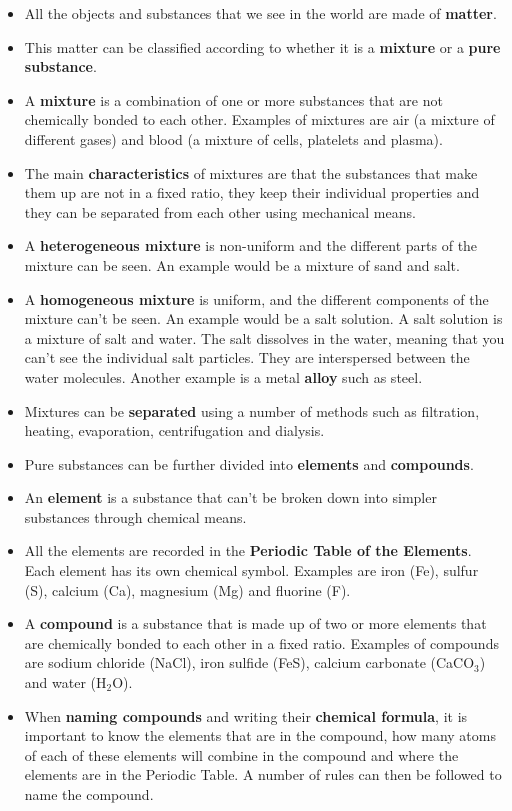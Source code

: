 \begin{itemize}
\item{All the objects and substances that we see in the world are made of \textbf{matter}.}
\item{This matter can be classified according to whether it is a \textbf{mixture} or a \textbf{pure substance}.}
\item{A \textbf{mixture} is a combination of one or more substances that are not chemically bonded to each other. Examples of mixtures are air (a mixture of different gases) and blood (a mixture of cells, platelets and plasma).}
\item{The main \textbf{characteristics} of mixtures are that the substances that make them up are not in a fixed ratio, they keep their individual properties and they can be separated from each other using mechanical means.}
\item{A \textbf{heterogeneous mixture} is non-uniform and the different parts of the mixture can be seen. An example would be a mixture of sand and salt.}
\item{A \textbf{homogeneous mixture} is uniform, and the different components of the mixture can't be seen. An example would be a salt solution. A salt solution is a mixture of salt and water. The salt dissolves in the water, meaning that you can't see the individual salt particles. They are interspersed between the water molecules. Another example is a metal \textbf{alloy} such as steel.}
\item{Mixtures can be \textbf{separated} using a number of methods such as filtration, heating, evaporation, centrifugation and dialysis.}
\item{Pure substances can be further divided into \textbf{elements} and \textbf{compounds}.}
\item{An \textbf{element} is a substance that can't be broken down into simpler substances through chemical means.}
\item{All the elements are recorded in the \textbf{Periodic Table of the Elements}. Each element has its own chemical symbol. Examples are iron (Fe), sulfur (S), calcium (Ca), magnesium (Mg) and fluorine (F).}
\item{A \textbf{compound} is a substance that is made up of two or more elements that are chemically bonded to each other in a fixed ratio. Examples of compounds are sodium chloride (NaCl), iron sulfide (FeS), calcium carbonate (CaCO$_{3}$) and water (H$_{2}$O).}
\item{When \textbf{naming compounds} and writing their \textbf{chemical formula}, it is important to know the elements that are in the compound, how many atoms of each of these elements will combine in the compound and where the elements are in the Periodic Table. A number of rules can then be followed to name the compound.}

\end{itemize}
